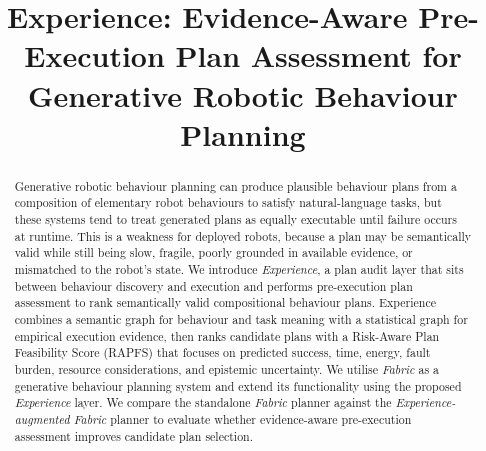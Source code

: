 \documentclass[letterpaper, 10pt, conference]{ieeeconf}
\begin{document}
\title{Experience: Evidence-Aware Pre-Execution Plan Assessment for Generative Robotic Behaviour Planning}


\maketitle

\begin{abstract}
Generative robotic behaviour planning can produce plausible behaviour plans from a composition of elementary robot behaviours to satisfy natural-language tasks, but these systems tend to treat generated plans as equally executable until failure occurs at runtime. This is a weakness for deployed robots, because a plan may be semantically valid while still being slow, fragile, poorly grounded in available evidence, or mismatched to the robot's state. We introduce \textit{Experience}, a plan audit layer that sits between behaviour discovery and execution and performs pre-execution plan assessment to rank semantically valid compositional behaviour plans. Experience combines a semantic graph for behaviour and task meaning with a statistical graph for empirical execution evidence, then ranks candidate plans with a Risk-Aware Plan Feasibility Score (RAPFS) that focuses on predicted success, time, energy, fault burden, resource considerations, and epistemic uncertainty. We utilise \textit{Fabric} as a generative behaviour planning system and extend its functionality using the proposed \textit{Experience} layer. We compare the standalone \textit{Fabric} planner against the \textit{Experience-augmented Fabric} planner to evaluate whether evidence-aware pre-execution assessment improves candidate plan selection.
\end{abstract}
\end{document}
